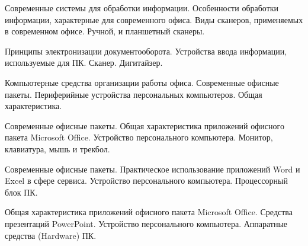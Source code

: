 \documentclass[
	14pt,
	a4paper,
	]
	{scrartcl}
\begin{document}
\shapk
{}
\setcounter{zad}{0}

\vfill
\z Современные системы для обработки информации. Особенности обработки информации, характерные для современного офиса.
 \vfill
\z Виды сканеров, применяемых в современном офисе. Ручной, и планшетный сканеры.
 \vfill

\vfill

\newpage


\shapk
{}
\setcounter{zad}{0}

\vfill
\z Принципы электронизации документооборота.
 \vfill
\z Устройства ввода информации, используемые для ПК. Сканер. Дигитайзер.
 \vfill

\vfill

\newpage


\shapk
{}
\setcounter{zad}{0}

\vfill
\z Компьютерные средства организации работы офиса. Современные офисные пакеты.
 \vfill
\z Периферийные устройства персональных компьютеров. Общая характеристика.
 \vfill

\vfill

\newpage


\shapk
{}
\setcounter{zad}{0}

\vfill
\z Современные офисные пакеты. Общая характеристика приложений офисного пакета Microsoft Office.
 \vfill
\z Устройство персонального компьютера. Монитор, клавиатура, мышь и трекбол.
 \vfill

\vfill

\newpage


\shapk
{}
\setcounter{zad}{0}

\vfill
\z Современные офисные пакеты. Практическое использование приложений Word и Excel в сфере сервиса.
 \vfill
\z Устройство персонального компьютера. Процессорный блок ПК.
 \vfill

\vfill

\newpage


\shapk
{}
\setcounter{zad}{0}

\vfill
\z Общая характеристика приложений офисного пакета Microsoft Office. Средства презентаций PowerPoint.
 \vfill
\z Устройство персонального компьютера. Аппаратные средства (Hardware) ПК.
 \vfill

\vfill

\newpage


\shapk
{}
\setcounter{zad}{0}
\end{document}

